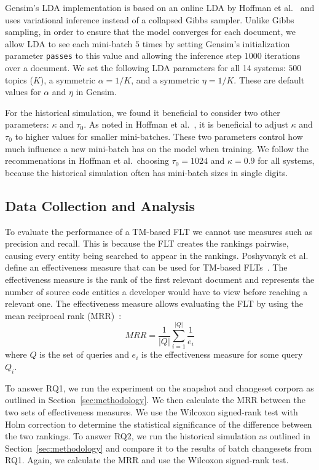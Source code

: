 Gensim's LDA implementation is based on an online LDA by Hoffman et
al.~\cite{Hoffman-etal:2010} and uses variational inference instead of
a collapsed Gibbs sampler.  Unlike Gibbs sampling, in order to ensure that the
model converges for each document, we allow LDA to see each mini-batch $5$ times
by setting Gensim's initialization parameter \texttt{passes} to this value and
allowing the inference step $1000$ iterations over a document.  We set the
following LDA parameters for all 14 systems: $500$ topics ($K$), a symmetric
$\alpha=1/K$, and a symmetric $\eta=1/K$.  These are default values for
$\alpha$ and $\eta$ in Gensim.

For the historical simulation, we found it beneficial to consider two other
parameters: $\kappa$ and $\tau_0$.  As noted in Hoffman et
al.~\cite{Hoffman-etal:2010}, it is beneficial to adjust $\kappa$ and $\tau_0$
to higher values for smaller mini-batches.  These two parameters control how
much influence a new mini-batch has on the model when training.  We follow the
recommenations in Hoffman et al.\, choosing $\tau_0=1024$ and $\kappa=0.9$ for
all systems, because the historical simulation often has mini-batch sizes in
single digits.




\subsection{Data Collection and Analysis}
\label{sec:data}

To evaluate the performance of a TM-based FLT we cannot use
measures such as precision and recall. This is because the FLT creates
the rankings pairwise, causing every entity being searched to appear in the rankings.
Poshyvanyk et al. define an effectiveness measure that can be used for TM-based FLTs~\cite{Poshyvanyk-etal:2007}.
The effectiveness measure is the rank of the first relevant document
and represents the number of source code entities a developer would have to view before reaching a relevant one.
The effectiveness measure allows evaluating the FLT by using
the mean reciprocal rank (MRR)~\cite{Voorhees:1999}: %
\begin{equation}
    MRR = \frac{1}{|Q|} \sum_{i=1}^{|Q|} \frac{1}{e_i}
\end{equation}
where $Q$ is the set of queries
and $e_i$ is the effectiveness measure for some query $Q_i$.

To answer RQ1, we run the experiment on the snapshot and changeset
corpora as outlined in Section~\ref{sec:methodology}.
We then calculate the MRR between the two sets of effectiveness measures.
We use the Wilcoxon signed-rank test with Holm correction to determine
the statistical significance of the difference between the two rankings.
To answer RQ2, we run the historical simulation as outlined in Section~\ref{sec:methodology}
and compare it to the results of batch changesets from RQ1.
Again, we calculate the MRR and use the Wilcoxon signed-rank test.

